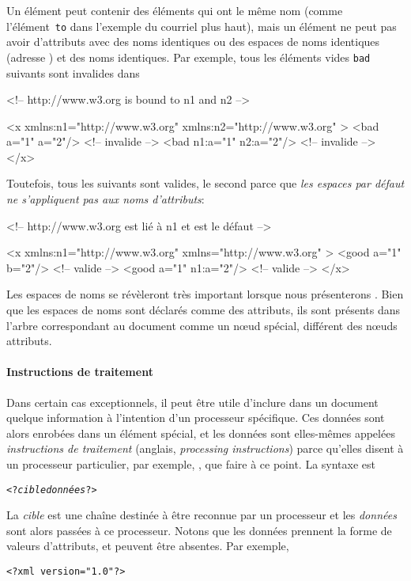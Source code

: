 

\noindent Un élément peut contenir des éléments qui ont le même nom
(comme l'élément~\texttt{to} dans l'exemple du courriel plus haut),
mais un élément ne peut pas avoir d'attributs avec des noms identiques
ou des espaces de noms identiques (adresse \HTTP) et des noms
identiques. Par exemple, tous les éléments vides \texttt{bad} suivants
sont invalides dans
\begin{sverb}
<!-- http://www.w3.org is bound to n1 and n2 -->

<x xmlns:n1="http://www.w3.org" xmlns:n2="http://www.w3.org" >
  <bad a="1"    a="2"/>     <!-- invalide -->
  <bad n1:a="1" n2:a="2"/>  <!-- invalide -->
</x>
\end{sverb}
Toutefois, tous les suivants sont valides, le second parce que
\emph{les espaces par défaut ne s'appliquent pas aux noms
  d'attributs}:
\begin{sverb}
<!-- http://www.w3.org est lié à n1 et est le défaut -->

<x xmlns:n1="http://www.w3.org" xmlns="http://www.w3.org" >
  <good a="1" b="2"/>    <!-- valide -->
  <good a="1" n1:a="2"/> <!-- valide -->
</x>
\end{sverb}
Les espaces de noms se révèleront très important lorsque nous
présenterons \XSLT. Bien que les espaces de noms sont déclarés comme
des attributs, ils sont présents dans l'arbre \XML correspondant au
document comme un n{\oe}ud spécial, différent des n{\oe}uds attributs.

\paragraph{Instructions de traitement}

Dans certain cas exceptionnels, il peut être utile d'inclure dans un
document \XML quelque information à l'intention d'un processeur \XML
spécifique. Ces données sont alors enrobées dans un élément spécial,
et les données sont elles-mêmes appelées \emph{instructions de
  traitement} (anglais, \emph{processing instructions}) parce qu'elles
disent à un processeur particulier, par exemple, \Saxon, que faire à
ce point. La syntaxe est
\begin{alltt}
<?\textit{cible} \textit{données}?>
\end{alltt}
La \emph{cible} est une chaîne destinée à être reconnue par un
processeur et les \emph{données} sont alors passées à ce
processeur. Notons que les données prennent la forme de valeurs
d'attributs, et peuvent être absentes. Par exemple,
\begin{verbatim}
<?xml version="1.0"?>
\end{verbatim}

